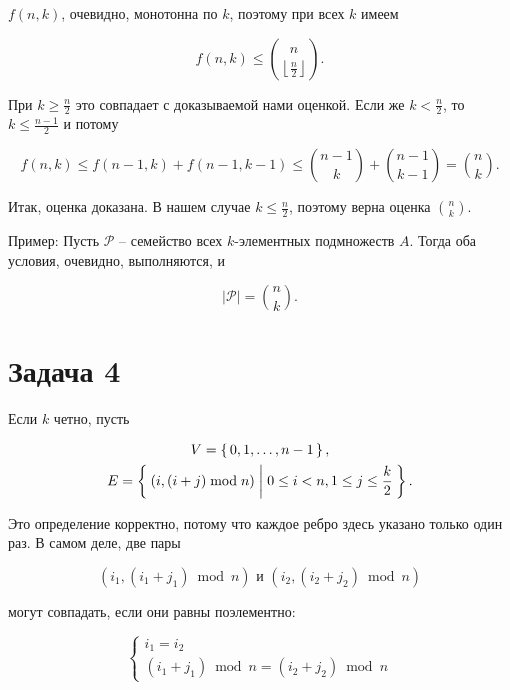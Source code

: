 \documentclass{article}
\newcommand{\abs}[1]{\left\lvert#1\right\rvert}
\newcommand{\floor}[1]{\left\lfloor#1\right\rfloor}
\begin{document}
	$f(n, k)$, очевидно, монотонна по $k$, поэтому при всех $k$ имеем

	\begin{equation*}
		f(n, k) \le \binom{n}{\floor{\frac{n}{2}}}.
	\end{equation*}

	При $k \ge \frac{n}{2}$ это совпадает с доказываемой нами оценкой. Если же $k < \frac{n}{2}$, то $k \le \frac{n-1}{2}$ и потому

	\begin{equation*}
		f(n, k) \le f(n-1, k) + f(n-1, k-1) \le \binom{n-1}{k} + \binom{n-1}{k-1} = \binom{n}{k}.
	\end{equation*}

	Итак, оценка доказана. В нашем случае $k \le \frac{n}{2}$, поэтому верна оценка $\binom{n}{k}$.

	Пример: Пусть $\mathcal{P}$ -- семейство всех $k$-элементных подмножеств $A$. Тогда оба условия, очевидно, выполняются, и

	\begin{equation*}
		\abs{\mathcal{P}} = \binom{n}{k}.
	\end{equation*}


	\section*{Задача 4}

	Если $k$ четно, пусть

	\begin{gather*}
		V = \set{0, 1, \dots, n-1}, \\
		E = \Set{(i, (i+j) \bmod n) | 0 \le i < n, 1 \le j \le \frac{k}{2}}.
	\end{gather*}

	Это определение корректно, потому что каждое ребро здесь указано только один раз. В самом деле, две пары

	\begin{equation*}
		(i_1, (i_1+j_1) \bmod n) \text{ и } (i_2, (i_2+j_2) \bmod n)
	\end{equation*}

	могут совпадать, если они равны поэлементно:

	\begin{equation*}
		\begin{cases}
			i_1 = i_2 \\
			(i_1+j_1) \bmod n = (i_2+j_2) \bmod n
		\end{cases}
	\end{equation*}
\end{document}
